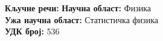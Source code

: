 






\noindent
\textbf{Кључне речи:} %
\textbf{Научна област:} Физика \\
\textbf{Ужа научна област:} Статистичка физика \\
\textbf{УДК број:} 536 %


\pagebreak

